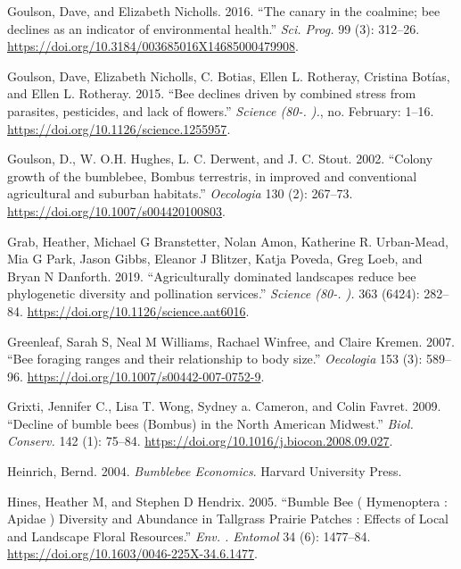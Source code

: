 \documentclass[11pt,]{article}
\begin{document}
\leavevmode\hypertarget{ref-Goulson2016}{}%
Goulson, Dave, and Elizabeth Nicholls. 2016. ``The canary in the
coalmine; bee declines as an indicator of environmental health.''
\emph{Sci. Prog.} 99 (3): 312--26.
\url{https://doi.org/10.3184/003685016X14685000479908}.

\leavevmode\hypertarget{ref-Goulson2015c}{}%
Goulson, Dave, Elizabeth Nicholls, C. Botias, Ellen L. Rotheray,
Cristina Botías, and Ellen L. Rotheray. 2015. ``Bee declines driven by
combined stress from parasites, pesticides, and lack of flowers.''
\emph{Science (80-. ).}, no. February: 1--16.
\url{https://doi.org/10.1126/science.1255957}.

\leavevmode\hypertarget{ref-Goulson2002c}{}%
Goulson, D., W. O.H. Hughes, L. C. Derwent, and J. C. Stout. 2002.
``Colony growth of the bumblebee, Bombus terrestris, in improved and
conventional agricultural and suburban habitats.'' \emph{Oecologia} 130
(2): 267--73. \url{https://doi.org/10.1007/s004420100803}.

\leavevmode\hypertarget{ref-Grab2019}{}%
Grab, Heather, Michael G Branstetter, Nolan Amon, Katherine R.
Urban-Mead, Mia G Park, Jason Gibbs, Eleanor J Blitzer, Katja Poveda,
Greg Loeb, and Bryan N Danforth. 2019. ``Agriculturally dominated
landscapes reduce bee phylogenetic diversity and pollination services.''
\emph{Science (80-. ).} 363 (6424): 282--84.
\url{https://doi.org/10.1126/science.aat6016}.

\leavevmode\hypertarget{ref-Greenleaf2007b}{}%
Greenleaf, Sarah S, Neal M Williams, Rachael Winfree, and Claire Kremen.
2007. ``Bee foraging ranges and their relationship to body size.''
\emph{Oecologia} 153 (3): 589--96.
\url{https://doi.org/10.1007/s00442-007-0752-9}.

\leavevmode\hypertarget{ref-Grixti2009}{}%
Grixti, Jennifer C., Lisa T. Wong, Sydney a. Cameron, and Colin Favret.
2009. ``Decline of bumble bees (Bombus) in the North American Midwest.''
\emph{Biol. Conserv.} 142 (1): 75--84.
\url{https://doi.org/10.1016/j.biocon.2008.09.027}.

\leavevmode\hypertarget{ref-Heinrich2004}{}%
Heinrich, Bernd. 2004. \emph{Bumblebee Economics}. Harvard University
Press.

\leavevmode\hypertarget{ref-Hines2005}{}%
Hines, Heather M, and Stephen D Hendrix. 2005. ``Bumble Bee (
Hymenoptera : Apidae ) Diversity and Abundance in Tallgrass Prairie
Patches : Effects of Local and Landscape Floral Resources.'' \emph{Env.
. Entomol} 34 (6): 1477--84.
\url{https://doi.org/10.1603/0046-225X-34.6.1477}.
\end{document}
